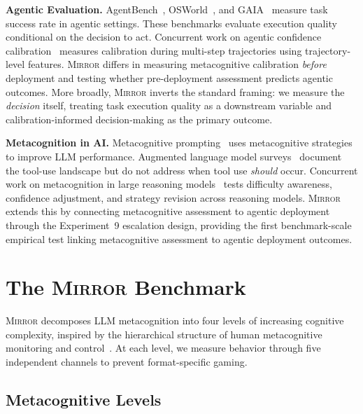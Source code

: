 \documentclass[10pt]{article}
\newcommand{\mirror}{\textsc{Mirror}}
\begin{document}
\textbf{Agentic Evaluation.}
AgentBench~\citep{liu2023agentbench}, OSWorld~\citep{xie2024osworld}, and
GAIA~\citep{mialon2023gaia} measure task success rate in agentic settings. These
benchmarks evaluate execution quality conditional on the decision to act.
Concurrent work on agentic confidence calibration~\citep{htc2026} measures
calibration during multi-step trajectories using trajectory-level features.
\mirror{} differs in measuring metacognitive calibration \textit{before} deployment
and testing whether pre-deployment assessment predicts agentic outcomes. More
broadly, \mirror{} inverts the standard framing: we measure the \textit{decision}
itself, treating task execution quality as a downstream variable and
calibration-informed decision-making as the primary outcome.

\textbf{Metacognition in AI.}
Metacognitive prompting~\citep{wang2024metacognitive} uses metacognitive strategies
to improve LLM performance. Augmented language model surveys~\citep{mialon2023augmented}
document the tool-use landscape but do not address when tool use \textit{should}
occur. Concurrent work on metacognition in large reasoning
models~\citep{metacog2026} tests difficulty awareness, confidence adjustment, and
strategy revision across reasoning models. \mirror{} extends this by connecting
metacognitive assessment to agentic deployment through the Experiment~9 escalation
design, providing the first benchmark-scale empirical test linking metacognitive
assessment to agentic deployment outcomes.

\section{The \mirror{} Benchmark}
\label{sec:benchmark}

\mirror{} decomposes LLM metacognition into four levels of increasing cognitive
complexity, inspired by the hierarchical structure of human metacognitive monitoring
and control~\citep{flavell1979metacognition, nelson1990metamemory}. At each level,
we measure behavior through five independent channels to prevent format-specific
gaming.

\subsection{Metacognitive Levels}
\end{document}

